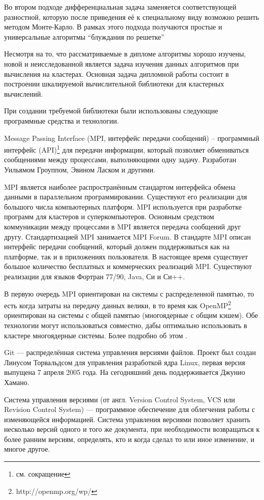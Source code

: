 Во втором подходе дифференциальная задача заменяется соответствующей разностной,
которую после приведения её к специальному виду возможно решить
методом Монте-Карло. В рамках этого подхода получаются простые и универсальные алгоритмы ``блуждания по решетке''

Несмотря на то, что рассматриваемые в дипломе алгоритмы хорошо изучены, новой и неисследованной является задача изучения данных алгоритмов при вычисления на кластерах. Основная задача дипломной работы состоит в  построении шкалируемой вычислительной библиотеки для кластерных вычислений.  

При создании требуемой библиотеки были использованы следующие программные средства и технологии.   

Message Passing Interface (MPI, интерфейс передачи сообщений) -- программный интерфейс (API)\footnote{см. сокращение} для передачи информации, который позволяет обмениваться сообщениями между процессами, выполняющими одну задачу. Разработан Уильямом Гроуппом, Эвином Ласком и другими.

MPI является наиболее распространённым стандартом интерфейса обмена данными в параллельном программировании. Существуют его реализации для большого числа компьютерных платформ. MPI используется при разработке программ для кластеров и суперкомпьютеров. Основным средством коммуникации между процессами в MPI является передача сообщений друг другу. Стандартизацией MPI занимается MPI Forum. В стандарте MPI описан интерфейс передачи сообщений, который должен поддерживаться как на платформе, так и в приложениях пользователя. В настоящее время существует большое количество бесплатных и коммерческих реализаций MPI. Существуют реализации для языков Фортран 77/90, Java, Си и Си++.

В первую очередь MPI ориентирован на системы с распределенной памятью, то есть когда затраты на передачу данных велики, в то время как OpenMP\footnote{http://openmp.org/wp/} ориентирован на системы с общей памятью (многоядерные с общим кэшем). Обе технологии могут использоваться совместно, дабы оптимально использовать в кластере многоядерные системы. Более подробно об этом \cite{mpi:offsite}.

Git — распределённая система управления версиями файлов. Проект был создан Линусом Торвальдсом для управления разработкой ядра Linux, первая версия выпущена 7 апреля 2005 года. На сегодняшний день поддерживается Джунио Хамано.

Система управления версиями (от англ. Version Control System, VCS или Revision Control System) — программное обеспечение для облегчения работы с изменяющейся информацией. Система управления версиями позволяет хранить несколько версий одного и того же документа, при необходимости возвращаться к более ранним версиям, определять, кто и когда сделал то или иное изменение, и многое другое.

